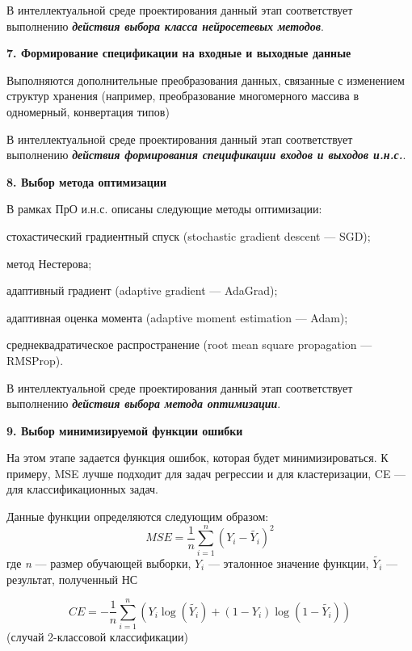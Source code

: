 В интеллектуальной среде проектирования данный этап соответствует выполнению \textbf{\textit{действия выбора класса нейросетевых методов}}.


\textbf{7. Формирование спецификации на входные и выходные данные}

Выполняются дополнительные преобразования данных, связанные с изменением структур хранения (например, преобразование многомерного массива в одномерный, конвертация типов)

В интеллектуальной среде проектирования данный этап соответствует выполнению \textbf{\textit{действия формирования спецификации входов и выходов и.н.с.}}.


\textbf{8. Выбор метода оптимизации }

В рамках ПрО и.н.с. описаны следующие методы оптимизации:
\begin{textitemize}
	\item стохастический градиентный спуск (stochastic gradient descent --- SGD);
	\item метод Нестерова;
	\item адаптивный градиент (adaptive gradient --- AdaGrad);
	\item адаптивная оценка момента (adaptive moment estimation --- Adam);
	\item среднеквадратическое распространение (root mean square propagation --- RMSProp).
\end{textitemize}

В интеллектуальной среде проектирования данный этап соответствует выполнению \textbf{\textit{действия выбора метода оптимизации}}.


\textbf{9. Выбор минимизируемой функции ошибки}

На этом этапе задается функция ошибок, которая будет минимизироваться. К примеру, MSE лучше подходит для задач регрессии и для кластеризации, CE --- для классификационных задач.

Данные функции определяются следующим образом:
\begin{equation*}
	MSE = \frac{1}{n} \sum_{i=1}^n (Y_i - \widetilde{Y_i})^2
\end{equation*}
где \textit{n} --- размер обучающей выборки, $Y_i$ --- эталонное значение функции, $\widetilde{Y_i}$ --- результат, полученный НС

\begin{equation*}
	CE = - \frac{1}{n} \sum_{i=1}^n (Y_i\log(\widetilde{Y_i}) + (1-Y_i)\log(1 - \widetilde{Y_i}))
\end{equation*}
(случай 2-классовой классификации)

